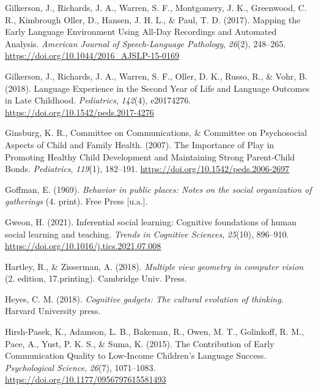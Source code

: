 \documentclass[
  english,
  12pt,
  man,floatsintext]{apa6}
\newlength{\cslhangindent}
\newenvironment{CSLReferences}[2] %
 {\begin{list}{}{%
  \setlength{\itemindent}{0pt}
  \setlength{\leftmargin}{0pt}
  \setlength{\parsep}{0pt}
  \ifodd #1
   \setlength{\leftmargin}{\cslhangindent}
   \setlength{\itemindent}{-1\cslhangindent}
  \fi
  \setlength{\itemsep}{#2\baselineskip}}}
 {\end{list}}
\begin{document}
\begin{CSLReferences}{1}{0}
Gilkerson, J., Richards, J. A., Warren, S. F., Montgomery, J. K., Greenwood, C. R., Kimbrough Oller, D., Hansen, J. H. L., \& Paul, T. D. (2017). Mapping the {Early Language Environment Using All-Day Recordings} and {Automated Analysis}. \emph{American Journal of Speech-Language Pathology}, \emph{26}(2), 248--265. \url{https://doi.org/10.1044/2016_AJSLP-15-0169}

Gilkerson, J., Richards, J. A., Warren, S. F., Oller, D. K., Russo, R., \& Vohr, B. (2018). Language {Experience} in the {Second Year} of {Life} and {Language Outcomes} in {Late Childhood}. \emph{Pediatrics}, \emph{142}(4), e20174276. \url{https://doi.org/10.1542/peds.2017-4276}

Ginsburg, K. R., Committee on Communications, \& Committee on Psychosocial Aspects of Child and Family Health. (2007). The {Importance} of {Play} in {Promoting Healthy Child Development} and {Maintaining Strong Parent-Child Bonds}. \emph{Pediatrics}, \emph{119}(1), 182--191. \url{https://doi.org/10.1542/peds.2006-2697}

Goffman, E. (1969). \emph{Behavior in public places: Notes on the social organization of gatherings} (4. print). Free Press {[}u.a.{]}.

Gweon, H. (2021). Inferential social learning: Cognitive foundations of human social learning and teaching. \emph{Trends in Cognitive Sciences}, \emph{25}(10), 896--910. \url{https://doi.org/10.1016/j.tics.2021.07.008}

Hartley, R., \& Zisserman, A. (2018). \emph{Multiple view geometry in computer vision} (2. edition, 17.printing). Cambridge Univ. Press.

Heyes, C. M. (2018). \emph{Cognitive gadgets: {The} cultural evolution of thinking}. Harvard University press.

Hirsh-Pasek, K., Adamson, L. B., Bakeman, R., Owen, M. T., Golinkoff, R. M., Pace, A., Yust, P. K. S., \& Suma, K. (2015). The {Contribution} of {Early Communication Quality} to {Low-Income Children}'s {Language Success}. \emph{Psychological Science}, \emph{26}(7), 1071--1083. \url{https://doi.org/10.1177/0956797615581493}


\end{CSLReferences}
\end{document}
